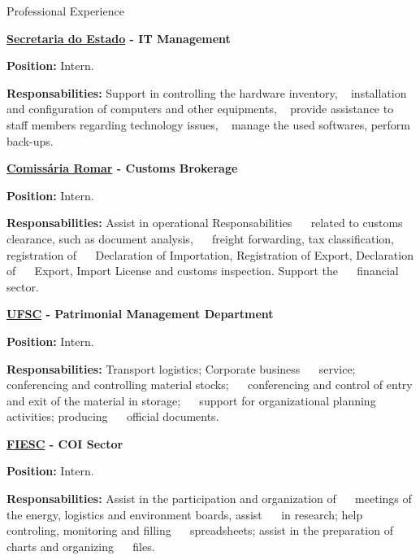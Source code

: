 \begin{rubric}{Professional Experience}{

  \entry*[2016]
  \textbf{\href{http://www.sds.sc.gov.br/}{Secretaria do Estado}
    - IT Management}

  \textbf{Position:} Intern.

  \textbf{Responsabilities:} Support in controlling the hardware inventory,
  installation and configuration of computers and other equipments,
  provide assistance to staff members regarding technology issues,
  manage the used softwares, perform back-ups.


  \entry*[2014]
  \textbf{\href{http://www.comissariaromar.com.br/}{Comissária Romar}
    - Customs Brokerage}

  \textbf{Position:} Intern.

  \textbf{Responsabilities:} Assist in operational Responsabilities
   related to customs clearance, such as document analysis,
   freight forwarding, tax classification, registration of
   Declaration of Importation, Registration of Export, Declaration of
   Export, Import License and customs inspection. Support the
   financial sector.

  \entry*[2013 - 2014]
  \textbf{\href{http://www.ufsc.br/}{UFSC} - Patrimonial Management
    Department}

  \textbf{Position:} Intern.

  \textbf{Responsabilities:} Transport logistics; Corporate business
   service; conferencing and controlling material stocks;
   conferencing and control of entry and exit of the material in storage;
   support for organizational planning activities; producing
   official documents.


  \entry*[2012 - 2013]
  \textbf{\href{http://www.fiesc.com.br/}{FIESC} - COI Sector}

  \textbf{Position:} Intern.

  \textbf{Responsabilities:} Assist in the participation and organization of
   meetings of the energy, logistics and environment boards, assist
   in research; help controling, monitoring and filling
   spreadsheets; assist in the preparation of charts and organizing
   files.

}\end{rubric}

